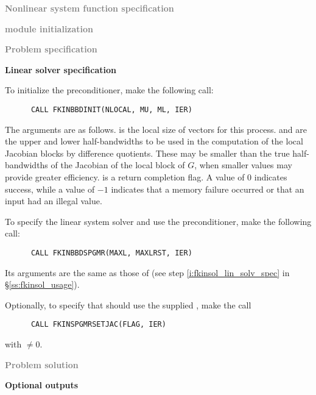 \begin{Steps}
  
\item \textcolor{gray}{\bf Nonlinear system function specification}

\item \textcolor{gray}{\bf {\nvector} module initialization}

\item \textcolor{gray}{\bf Problem specification}

\item {\bf Linear solver specification}

  To initialize the {\kinbbdpre} preconditioner, make the following call:
\begin{verbatim}
      CALL FKINBBDINIT(NLOCAL, MU, ML, IER)
\end{verbatim}
  The arguments are as follows.
   is the local size of vectors for this process.
   and  are the upper and lower half-bandwidths to be used in 
  the computation of the local Jacobian blocks by difference quotients.
  These may be smaller than the true half-bandwidths of the
  Jacobian of the local block of $G$, when smaller values may
  provide greater efficiency.
   is a return completion flag.  A value of $0$ indicates success, while
  a value of $-1$ indicates that a memory failure occurred or that an input had
  an illegal value.
  
  To specify the {\spgmr} linear system solver and use the {\kinbbdpre}
  preconditioner, make the following call:
\begin{verbatim}
      CALL FKINBBDSPGMR(MAXL, MAXLRST, IER)
\end{verbatim}
  Its arguments are the same as those of 
  (see step \ref{i:fkinsol_lin_solv_spec} in \S\ref{ss:fkinsol_usage}).
  
  Optionally, to specify that {\spgmr} should use the supplied , 
  make the call
\begin{verbatim}
      CALL FKINSPGMRSETJAC(FLAG, IER)
\end{verbatim}
  with  $\neq 0$.
  
\item \textcolor{gray}{\bf Problem solution}
  
\item {\bf {\kinbbdpre} Optional outputs}
  

\end{Steps}
